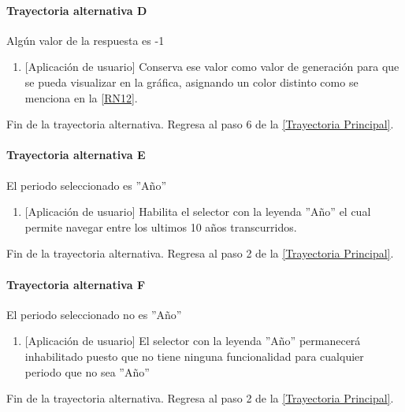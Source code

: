 \paragraph{Trayectoria alternativa D} \label{SUB-U-CU1.3:TD}
	Algún valor de la respuesta es -1
	\begin{enumerate}[label=D\arabic*.]
		\item {[Aplicación de usuario]} Conserva ese valor como valor de generación para que se pueda visualizar en la gráfica, asignando un color distinto como se menciona en la \ref{RN12}.
	\end{enumerate}
	Fin de la trayectoria alternativa. Regresa al paso 6 de la \hyperref[SUB-U-CU1.3:TP]{[Trayectoria Principal]}.
	
\paragraph{Trayectoria alternativa E} \label{SUB-U-CU1.3:TE}
	El periodo seleccionado es ''Año''
	\begin{enumerate}[label=E\arabic*.]
		\item {[Aplicación de usuario]} Habilita el selector con la leyenda ''Año'' el cual permite navegar entre los ultimos 10 años transcurridos.
	\end{enumerate}
	Fin de la trayectoria alternativa. Regresa al paso 2 de la \hyperref[SUB-U-CU1.3:TP]{[Trayectoria Principal]}.

\paragraph{Trayectoria alternativa F} \label{SUB-U-CU1.3:TF}
	El periodo seleccionado no es ''Año''
	\begin{enumerate}[label=F\arabic*.]
		\item {[Aplicación de usuario]} El selector con la leyenda ''Año'' permanecerá inhabilitado puesto que no tiene ninguna funcionalidad para cualquier periodo que no sea ''Año''
	\end{enumerate}
	Fin de la trayectoria alternativa. Regresa al paso 2 de la \hyperref[SUB-U-CU1.3:TP]{[Trayectoria Principal]}.